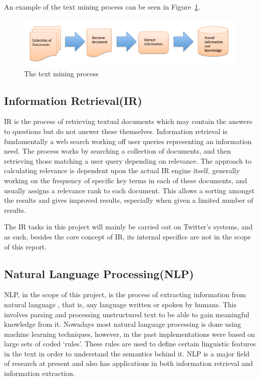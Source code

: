 An example of the text mining process can be seen in Figure~\ref{fig:tm}.
\begin{figure}[t]
\begin{center}
\includegraphics[width=15cm]{tm}
\end{center}
\caption{The text mining process\cite{Gupta_Lehal_2009}}
\label{fig:tm}
\end{figure}

\subsection[Information Retrieval]{Information Retrieval(IR)}
IR is the process of retrieving textual documents which may contain the answers to questions but do not answer these themselves\cite{Hearst:1999}. Information retrieval is fundamentally a web search working off user queries representing an information need. The process works by searching a collection of documents, and then retrieving those matching a user query depending on relevance. The approach to calculating relevance is dependent upon the actual IR engine itself, generally working on the frequency of specific key terms in each of these documents, and usually assigns a relevance rank to each document. This allows a sorting amongst the results and gives improved results, especially when given a limited number of results.

The IR tasks in this project will mainly be carried out on Twitter's systems, and as such, besides the core concept of IR, its internal specifics are not in the scope of this report.

\subsection[Natural Language Processing]{Natural Language Processing(NLP)}
NLP, in the scope of this project, is the process of extracting information from natural language \cite{Healey98}, that is, any language written or spoken by humans. This involves parsing and processing unstructured text to be able to gain meaningful knowledge from it. Nowadays most natural language processing is done using machine learning techniques, however, in the past implementations were based on large sets of coded `rules'. These rules are used to define certain linguistic features in the text in order to understand the semantics behind it. NLP is a major field of research at present and also has applications in both information retrieval and information extraction.

